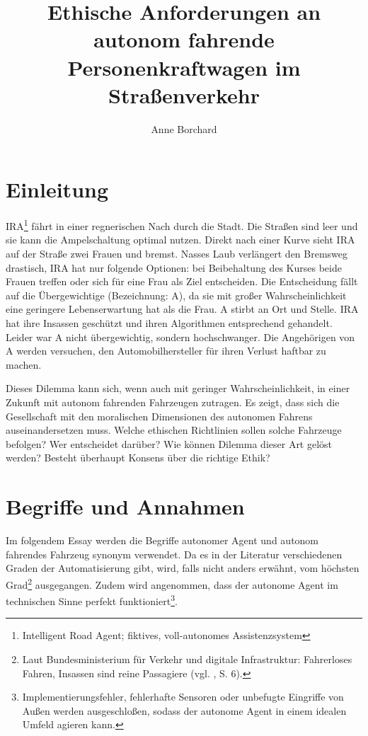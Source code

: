 \documentclass[a4paper, 12pt, titlepage]{scrartcl}
\begin{document}
\author{Anne Borchard}
\title{Ethische Anforderungen an autonom fahrende Personenkraftwagen im Stra\ss enverkehr}
\publishers{Humboldt-Universit\"at zu Berlin}
\maketitle
\tableofcontents
\newpage

\section{Einleitung}
	IRA\footnote{Intelligent Road Agent; fiktives, voll-autonomes Assistenzsystem} fährt in einer regnerischen Nach durch die Stadt. Die Straßen sind leer und sie kann die Ampelschaltung optimal nutzen. Direkt nach einer Kurve sieht IRA auf der Straße zwei Frauen und bremst. Nasses Laub verl\"angert den Bremsweg drastisch, IRA hat nur folgende Optionen: bei Beibehaltung des Kurses beide Frauen treffen oder sich f\"ur eine Frau als Ziel entscheiden. Die Entscheidung fällt auf die \"Ubergewichtige (Bezeichnung: A), da sie mit großer Wahrscheinlichkeit eine geringere Lebenserwartung hat als die Frau. A stirbt an Ort und Stelle. IRA hat ihre Insassen geschützt und ihren Algorithmen entsprechend gehandelt. Leider war A nicht übergewichtig, sondern hochschwanger. Die Angehörigen von A werden versuchen, den Automobilhersteller für ihren Verlust haftbar zu machen.
	
	Dieses Dilemma kann sich, wenn auch mit geringer Wahrscheinlichkeit, in einer Zukunft mit autonom fahrenden Fahrzeugen zutragen. Es zeigt, dass sich die Gesellschaft mit den moralischen Dimensionen des autonomen Fahrens auseinandersetzen muss. Welche ethischen Richtlinien sollen solche Fahrzeuge befolgen? Wer entscheidet dar\"uber? Wie k\"onnen Dilemma dieser Art gel\"ost werden? Besteht \"uberhaupt Konsens \"uber die \glqq richtige\grqq{} Ethik?
\section{Begriffe und Annahmen}
	Im folgendem Essay werden die Begriffe autonomer Agent und autonom fahrendes Fahrzeug synonym verwendet. Da es in der Literatur verschiedenen Graden der Automatisierung gibt, wird, falls nicht anders erw\"ahnt, vom h\"ochsten Grad\footnote{Laut Bundesministerium für Verkehr und digitale Infrastruktur: Fahrerloses Fahren, Insassen sind reine Passagiere (vgl. \autocite{bmvi2015}, S. 6).} ausgegangen. Zudem wird angenommen, dass der autonome Agent im technischen Sinne perfekt funktioniert\footnote{Implementierungsfehler, fehlerhafte Sensoren oder unbefugte Eingriffe von Au\ss en werden ausgeschlo\ss en, sodass der autonome Agent in einem idealen Umfeld agieren kann.}.
	
\end{document}
